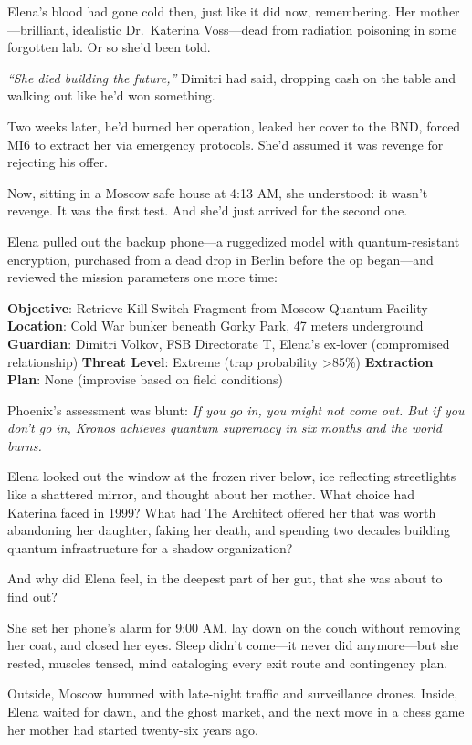 \documentclass[12pt,letterpaper]{book}
\begin{document}
Elena's blood had gone cold then, just like it did now, remembering. Her mother---brilliant, idealistic Dr.~Katerina Voss---dead from radiation poisoning in some forgotten lab. Or so she'd been told.

\emph{``She died building the future,''} Dimitri had said, dropping cash on the table and walking out like he'd won something.

Two weeks later, he'd burned her operation, leaked her cover to the BND, forced MI6 to extract her via emergency protocols. She'd assumed it was revenge for rejecting his offer.

Now, sitting in a Moscow safe house at 4:13 AM, she understood: it wasn't revenge. It was the first test. And she'd just arrived for the second one.

Elena pulled out the backup phone---a ruggedized model with quantum-resistant encryption, purchased from a dead drop in Berlin before the op began---and reviewed the mission parameters one more time:

\textbf{Objective}: Retrieve Kill Switch Fragment from Moscow Quantum Facility \textbf{Location}: Cold War bunker beneath Gorky Park, 47 meters underground \textbf{Guardian}: Dimitri Volkov, FSB Directorate T, Elena's ex-lover (compromised relationship) \textbf{Threat Level}: Extreme (trap probability \textgreater85\%) \textbf{Extraction Plan}: None (improvise based on field conditions)

Phoenix's assessment was blunt: \emph{If you go in, you might not come out. But if you don't go in, Kronos achieves quantum supremacy in six months and the world burns.}

Elena looked out the window at the frozen river below, ice reflecting streetlights like a shattered mirror, and thought about her mother. What choice had Katerina faced in 1999? What had The Architect offered her that was worth abandoning her daughter, faking her death, and spending two decades building quantum infrastructure for a shadow organization?

And why did Elena feel, in the deepest part of her gut, that she was about to find out?

She set her phone's alarm for 9:00 AM, lay down on the couch without removing her coat, and closed her eyes. Sleep didn't come---it never did anymore---but she rested, muscles tensed, mind cataloging every exit route and contingency plan.

Outside, Moscow hummed with late-night traffic and surveillance drones. Inside, Elena waited for dawn, and the ghost market, and the next move in a chess game her mother had started twenty-six years ago.
\end{document}
